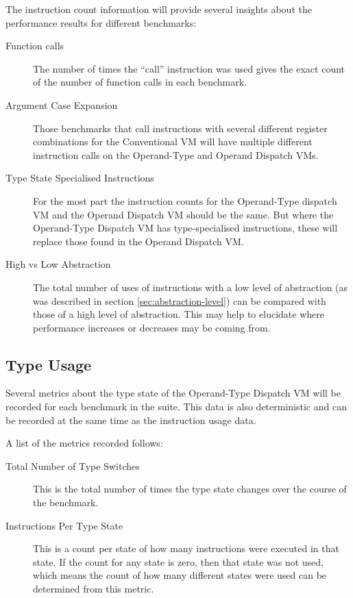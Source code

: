 \documentclass[english,a4paper,12pt]{report}
\begin{document}
The instruction count information will provide several insights about
the performance results for different benchmarks:
\begin{description}
\item[Function calls] The number of times the ``call'' instruction was
  used gives the exact count of the number of function calls in each
  benchmark.

\item[Argument Case Expansion] Those benchmarks that call instructions
  with several different register combinations for the Conventional VM
  will have multiple different instruction calls on the Operand-Type
  and Operand Dispatch VMs.

\item[Type State Specialised Instructions] For the most part the
  instruction counts for the Operand-Type dispatch VM and the Operand
  Dispatch VM should be the same. But where the Operand-Type Dispatch
  VM has type-specialised instructions, these will replace those found
  in the Operand Dispatch VM.

\item[High vs Low Abstraction] The total number of uses of
  instructions with a low level of abstraction (as was described in
  section \ref{sec:abstraction-level}) can be compared with those of a
  high level of abstraction. This may help to elucidate where
  performance increases or decreases may be coming from.
\end{description}

\subsection{Type Usage}

Several metrics about the type state of the Operand-Type Dispatch VM
will be recorded for each benchmark in the suite. This data is also
deterministic and can be recorded at the same time as the instruction
usage data. 

A list of the metrics recorded follows:
\begin{description}
\item[Total Number of Type Switches] This is the total number of times
  the type state changes over the course of the benchmark.
\item[Instructions Per Type State] This is a count per state of how
  many instructions were executed in that state. If the count for any
  state is zero, then that state was not used, which means the count
  of how many different states were used can be determined from this
  metric.
\end{description}
\end{document}

